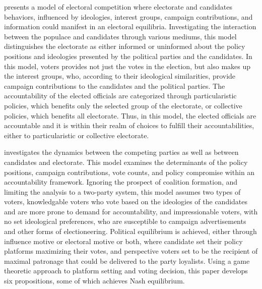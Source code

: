  presents a model of electoral competition where electorate and candidates behaviors, influenced by ideologies, interest groups, campaign contributions, and information could manifest in an electoral equilibria. Investigating the interaction between the populace and candidates through various mediums, this model distinguishes the electorate as either informed or uninformed about the policy positions and ideologies presented by the political parties and the candidates. In this model, voters provides not just the votes in the election, but also makes up the interest groups, who, according to their ideological similarities,  provide campaign contributions to the candidates and the political parties. The accountability of the elected officials are categorized through particularistic policies, which benefits only the selected group of the electorate, or collective policies, which benefits all electorate. Thus, in this model, the elected officials are accountable and it is within their realm of choices to fulfill their accountabilities, either to particularistic or collective electorate.\par
{} investigates the dynamics between the competing parties as well as between candidates and electorate. This model examines the determinants of the policy positions, campaign contributions, vote counts, and policy compromise within an accountability framework. Ignoring the prospect of coalition formation, and limiting the analysis to a two-party system, this model assumes two types of voters, knowledgable voters who vote based on the ideologies of the candidates and are more prone to demand for accountability, and impressionable voters, with no set ideological preferences, who are susceptible to campaign advertisements and other forms of electioneering. Political equilibrium is achieved, either through influence motive or electoral motive or both, where candidate set their policy platforms maximizing their votes, and perspective voters set to be the recipient of maximal patronage that could be delivered to the party loyalists. Using a game theoretic approach to platform setting and voting decision, this paper develops six propositions, some of which achieves Nash equilibrium.\par
